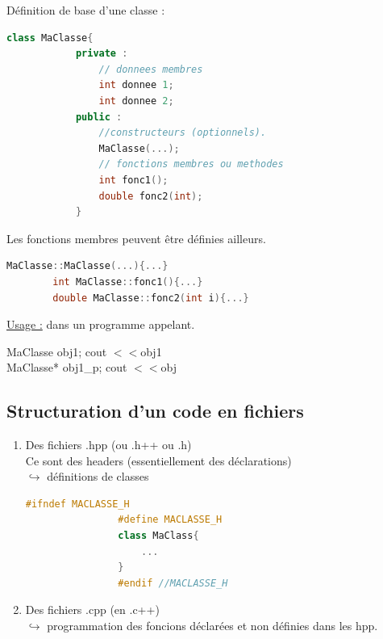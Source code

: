 \documentclass[12pt,a4paper]{article}
\begin{document}
	Définition de base d'une classe :
	
	\begin{lstlisting}[language=C++, caption=Définition d'une classe]
		class MaClasse{
			private :
				// donnees membres
				int donnee 1;
				int donnee 2;
			public :
				//constructeurs (optionnels).
				MaClasse(...);
				// fonctions membres ou methodes
				int fonc1();
				double fonc2(int);
			}
	\end{lstlisting}
	
	Les fonctions membres peuvent être définies ailleurs.
	
	\begin{lstlisting}[language=C++, caption=Définition d'une classe]
		MaClasse::MaClasse(...){...}
		int MaClasse::fonc1(){...}
		double MaClasse::fonc2(int i){...}
	\end{lstlisting}
	
	\noindent\underline{Usage :} dans un programme appelant.\\
	\hspace*{1.5cm}\begin{minipage}{15cm}
		MaClasse obj1; \hspace{1cm} cout $<<$obj1\\
		MaClasse* obj1\_p; \hspace{1cm} cout $<<$obj
	
	\end{minipage}
	
	\subsection{Structuration d'un code en fichiers}
	
	\begin{enumerate}[label=$\to$]
		\item Des fichiers .hpp (ou .h++ ou .h)\\
		Ce sont des headers (essentiellement des déclarations)\\
		$\hookrightarrow$ définitions de classes \begin{minipage}[t]{7cm}
			\begin{lstlisting}[language=C++,caption=Exemple de header]
				#ifndef MACLASSE_H
				#define MACLASSE_H
				class MaClass{
					...
				}
				#endif //MACLASSE_H
			\end{lstlisting}
		\end{minipage}
		\item Des fichiers .cpp (en .c++)\\
		$\hookrightarrow$ programmation des foncions déclarées et non définies dans les hpp.
	\end{enumerate}
	
\end{document}
